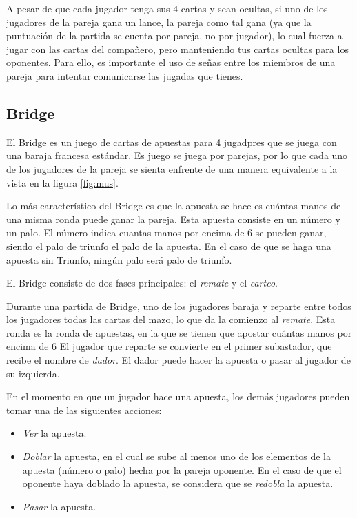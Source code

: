 A pesar de que cada jugador tenga sus 4 cartas y sean ocultas, si uno de los jugadores de la pareja gana un lance, la pareja como tal gana (ya que la puntuación de la partida se cuenta por pareja, no por jugador), lo cual fuerza a jugar con las cartas del compañero, pero manteniendo tus cartas ocultas para los oponentes. Para ello, es importante el uso de señas entre los miembros de una pareja para intentar comunicarse las jugadas que tienes.

\subsection{Bridge}

El Bridge\cite{bridge} es un juego de cartas de apuestas para 4 jugadpres que se juega con una baraja francesa estándar. Es juego se juega por parejas,  por lo que cada uno de los jugadores de la pareja se sienta enfrente de una manera equivalente a la vista en la figura \ref{fig:mus}. 

Lo más característico del Bridge es que la apuesta se hace es cuántas manos de una misma ronda puede ganar la pareja. Esta apuesta consiste en un número y un palo. El número indica cuantas manos por encima de 6 se pueden ganar, siendo el palo de triunfo el palo de la apuesta. En el caso de que se  haga una apuesta sin Triunfo, ningún palo será palo de triunfo. \cite{bridge}

El Bridge consiste de dos fases principales: el \textit{remate} y el \textit{carteo}.

Durante una partida de Bridge, uno de los jugadores baraja y reparte entre todos los jugadores todas las cartas del mazo, lo que da la comienzo al \textit{remate}. Esta ronda es la ronda de apuestas, en la que se tienen que apostar cuántas manos por encima de 6   El jugador que reparte se convierte en el primer subastador, que recibe el nombre de \textit{dador}. El dador puede hacer la apuesta o pasar al jugador de su izquierda.  \cite{bridge}

En el momento en que un jugador hace una apuesta, los demás jugadores pueden tomar una de las siguientes acciones:
\begin{itemize}
\item \textit{Ver} la apuesta.
\item \textit{Doblar} la apuesta, en el cual se sube al menos uno de los elementos de la apuesta (número o palo) hecha por la pareja oponente. En el caso de que el oponente haya doblado la apuesta, se considera que se \textit{redobla} la apuesta.
\item \textit{Pasar} la apuesta. 
\end{itemize} 

